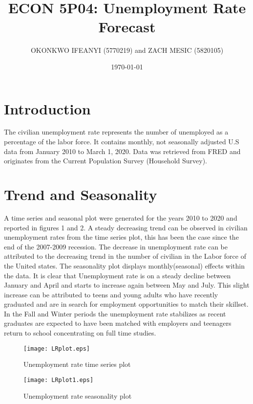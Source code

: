 \documentclass[12pt]{article}
\begin{document}
\title{ ECON 5P04: Unemployment Rate Forecast}
\author{OKONKWO IFEANYI (5770219) and ZACH MESIC (5820105)}
\date{\today} 
\maketitle


\newpage
\tableofcontents

\newpage
\section{Introduction}
The civilian unemployment rate represents the number of unemployed as a percentage of the labor force. It contains monthly, not seasonally adjusted U.S data from January 2010 to March 1, 2020. Data was retrieved from FRED and originates from the Current Population Survey (Household Survey). 

\section{Trend and Seasonality}
A time series and seasonal plot were generated for the years 2010 to 2020 and reported in figures 1 and 2. A steady decreasing trend can be observed in civilian unemployment rates from the time series plot,  this has been the case since the end of the 2007-2009 recession. The decrease in unemployment rate can be attributed to the decreasing trend in the number of civilian in the Labor force of the United states.
The seasonality plot displays monthly(seasonal) effects within the data. It is clear that Unemployment rate is on a steady decline between January and April and starts to increase again between May and July. This slight increase can be attributed to teens and young adults who have recently graduated and are in search for employment opportunities to match their skillset. In the Fall and Winter periods the unemployment rate stabilizes as recent graduates are expected to have been matched with employers and teenagers return to school concentrating on full time studies.

\newpage
\begin{figure}[h!]
\begin{center}
\texttt{[image: LRplot.eps]} 
\label{fig:1}
\end{center}
\caption{ Unemployment rate time series plot}
\end{figure}

\begin{figure}[h!]
\begin{center}
\texttt{[image: LRplot1.eps]} 
\label{fig:2}
\end{center}
\caption{ Unemployment rate seasonality plot}
\end{figure}
\break
\end{document}
